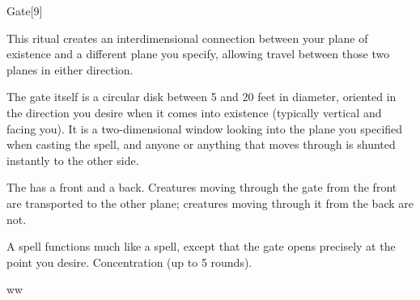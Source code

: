 \begin{spellsection}{Gate}[9]
    \begin{spellheader}
    \end{spellheader}
    \begin{spellcontent}
        \begin{spelltargetinginfo}
            \spellrng{\rngmed}
        \end{spelltargetinginfo}
        \begin{spelleffects}
            \spelleffect This ritual creates an interdimensional connection between your plane of existence and a different plane you specify, allowing travel between those two planes in either direction.
            \par The gate itself is a circular disk between 5 and 20 feet in diameter, oriented in the direction you desire when it comes into existence (typically vertical and facing you). It is a two-dimensional window looking into the plane you specified when casting the spell, and anyone or anything that moves through is shunted instantly to the other side.
            \par The  has a front and a back. Creatures moving through the gate from the front are transported to the other plane; creatures moving through it from the back are not.
            \par A  spell functions much like a  spell, except that the gate opens precisely at the point you desire.
            \spelldur Concentration (up to 5 rounds).
        \end{spelleffects}
    \end{spellcontent}
    \begin{spellfooter}
    \end{spellfooter}
    \begin{spellaugments}
        ww
    \end{spellaugments}
\end{spellsection}


